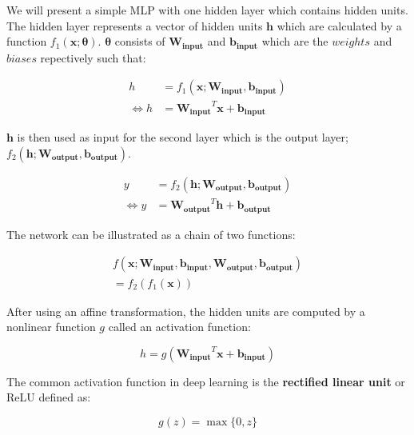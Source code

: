 We will present a simple MLP with one hidden layer which contains hidden units.
The hidden layer represents a vector of hidden units $\bm{h}$ which are
calculated by a function $f_{1}(\bm{x;\theta})$. $\bm{\theta}$ consists of
$\bm{W_{input}}$ and $\bm{b_{input}}$ which are the $weights$ and $biases$ repectively such
that:

\begin{equation}
  \begin{split}
    h & = f_{1}(\bm{x;W_{input},b_{input}}) \\
    \Leftrightarrow h & = \bm{W_{input}}^{T}\bm{x}+\bm{b_{input}}
  \end{split}
\end{equation}

$\bm{h}$ is then used as input for the second layer which is the output layer;
$f_{2}(\bm{h;W_{output},b_{output}})$. 

\begin{equation}
  \begin{split}
    y & = f_{2}(\bm{h;W_{output},b_{output}}) \\
    \Leftrightarrow y & = \bm{W_{output}}^{T}\bm{h}+\bm{b_{output}}
  \end{split}
\end{equation}

The network can be illustrated as a chain of two functions:

\begin{equation} 
  \begin{split}
  f(\bm{x;W_{input},b_{input},W_{output},b_{output}}) \\
  = f_{2}(f_{1}(\bm{x}))
  \end{split}
\end{equation}

After using an affine transformation, the hidden units are computed by a
nonlinear function $g$ called an activation function:

\begin{equation} 
  h = g(\bm{W_{input}}^{T}\bm{x+b_{input}})
\end{equation}

The common activation function in deep learning is the \textbf{rectified linear
unit} or ReLU defined as:

\begin{equation} 
  g(z) = \max\{0,z\}
\end{equation}



